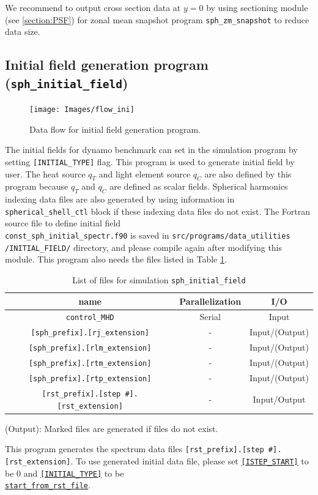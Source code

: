 We recommend to output cross section data at $y = 0$ by using sectioning module (see \ref{section:PSF}) for zonal mean snapshot program \verb|sph_zm_snapshot| to reduce data size.

\newpage
\subsection{Initial field generation program \\
({\tt sph\_initial\_field})}
\label{sec:sph_initial_field}
%
\begin{figure}[htbp]
\begin{center}
\texttt{[image: Images/flow\_ini]}
\end{center}
\caption{Data flow for initial field generation program.}
\label{fig:flow_ini}
\end{figure}
%
 The initial fields for dynamo benchmark can set in the simulation program by setting \verb|[INITIAL_TYPE]| flag. This program is used to generate initial field by user.  The heat source $q_{T}$ and light element source $q_{C}$ are also defined by this program because $q_{T}$ and $q_{C}$ are defined as scalar fields. Spherical harmonics indexing data files are also generated by using information in \verb|spherical_shell_ctl| block if these indexing data files do not exist. The Fortran source file to define initial field \\
 \verb|const_sph_initial_spectr.f90| is saved in \verb|src/programs/data_utilities| \\
 \verb|/INITIAL_FIELD/| directory,  and please compile again after modifying this module. This program also needs the files listed in Table \ref{table:inital_fld}.
%
\begin{table}[htp]
\caption{List of files for simulation {\tt sph\_initial\_field} }
\begin{center} 
\begin{tabular}{|c|c|c|}
\hline
 name & Parallelization & I/O \\ \hline \hline
\verb|control_MHD| & Serial & Input \\ \hline
\verb|[sph_prefix].[rj_extension]|  & - & Input/(Output) \\
\verb|[sph_prefix].[rlm_extension]| & - & Input/(Output) \\
\verb|[sph_prefix].[rtm_extension]| & - & Input/(Output) \\
\verb|[sph_prefix].[rtp_extension]| & - & Input/(Output) \\ \hline
\verb|[rst_prefix].[step #].[rst_extension]| & - & Input/Output  \\ \hline
\end{tabular}
\end{center}
(Output): Marked files are generated if files do not exist.
\label{table:inital_fld}
\end{table}
%
This program generates the spectrum data files \verb|[rst_prefix].[step #].[rst_extension]|. To use generated initial data file, please set 
\hyperref[href_t:i_step_init_ctl]{{\tt [ISTEP\_START]}} to be 0 and \hyperref[href_t:restart_file_ctl]{{\tt [INITIAL\_TYPE]}} to be \\
\hyperref[href_t:restart_file_ctl]{{\tt start\_from\_rst\_file}}.

